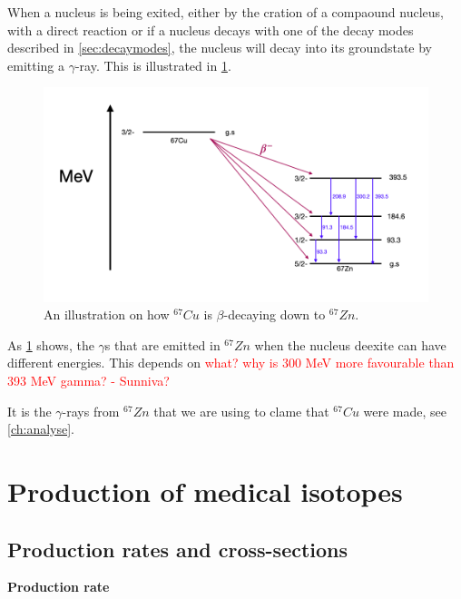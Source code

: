 \documentclass[twoside,english]{uiofysmaster/uiofysmaster}
\begin{document}
When a nucleus is being exited, either by the cration of a compaound nucleus, with a direct reaction or if a nucleus decays with one of the decay modes described in \ref{sec:decaymodes}, the nucleus will decay into its groundstate by emitting a $\gamma$-ray. This is illustrated in \ref{fig:67cu_decay}.

\begin{figure}[h!]
    \centering
     \includegraphics[scale=0.4]{67Cu_decay.PNG}
     \caption{An illustration on how $^{67}Cu$ is $\beta$-decaying down to $^{67}Zn$. } 
    \label{fig:67cu_decay}
\end{figure}
\noindent
As \ref{fig:67cu_decay} shows, the $\gamma$s that are emitted in $^{67}Zn$ when the nucleus deexite can have different energies. This depends on \textcolor{red}{what? why is 300 MeV more favourable than 393 MeV gamma? - Sunniva?}

It is the $\gamma$-rays from $^{67}Zn$ that we are using to clame that $^{67}Cu$ were made, see \ref{ch:analyse}.


\section{Production of medical isotopes}
\subsection{Production rates and cross-sections}
\noindent
\textbf{Production rate}
\end{document}
